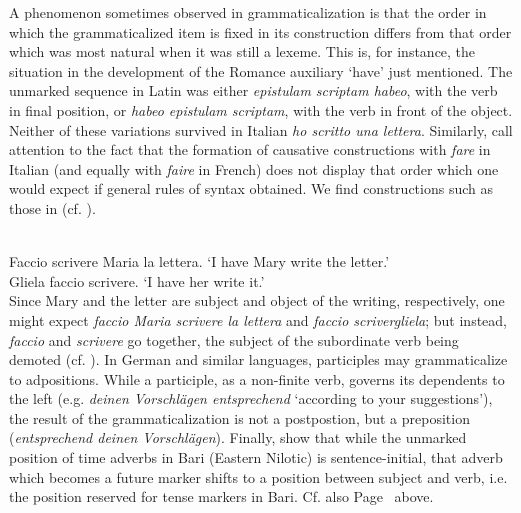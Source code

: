 A phenomenon sometimes observed in grammaticalization is that the order in which the grammaticalized item is fixed in its construction differs from that order which was most natural when it was still a lexeme. This is, for instance, the situation in the development of the Romance auxiliary ‘have’ just mentioned. The unmarked sequence in Latin was either \textit{epistulam scriptam habeo}, with the verb in final position, or \textit{habeo epistulam scriptam}, with the verb in front of the object. Neither of these variations survived in Italian \textit{ho scritto una lettera}. Similarly, \citet[423f]{MallinsonEtAl1981} call attention to the fact that the formation of causative constructions with \textit{fare} in Italian (and equally with \textit{faire} in French) does not display that order which one would expect if general rules of syntax obtained. We find constructions such as those in  (cf. \citealt[162]{Comrie1981b}).

\ea\label{ex:E112}
\langinfo{\LangItal}{}{}\\
 \ea  Faccio scrivere Maria la lettera.
 \glt ‘I have Mary write the letter.’\\
 \ex  Gliela faccio scrivere. 
\glt ‘I have her write it.’\\
\z
\z
\noindent Since Mary and the letter are subject and object of the writing, respectively, one might expect \textit{faccio Maria scrivere la lettera} and \textit{faccio scrivergliela}; but instead, \textit{faccio} and \textit{scrivere} go together, the subject of the subordinate verb being demoted (cf. \citealt[§~8.2]{Comrie1981b}). In German and similar languages, participles may grammaticalize to adpositions. While a participle, as a non-finite  verb, governs its dependents to the left (e.g. \textit{deinen Vorschlägen entsprechend} ‘according to your suggestions’), the result of the grammaticalization is not a postpostion, but a preposition (\textit{entsprechend deinen Vorschlägen}). Finally, \citet[132]{HeineEtAl1984} show that while the unmarked position of time adverbs in Bari (Eastern Nilotic) is sentence-initial, that adverb which becomes a future marker shifts to a position between subject and verb, i.e. the position reserved for tense markers in Bari. Cf. also Page~\pageref{page39b}\chk%
 above.

